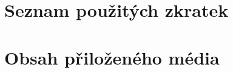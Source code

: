 \documentclass[thesis=B,czech,hidelinks]{dependencies/Thesis}
\begin{document}

\renewcommand{\thefigure}{\arabic{chapter}.\arabic{figure}}
\renewcommand{\figurename}{Obrázek}

\renewcommand{\thetable}{\arabic{chapter}.\arabic{table}}
\renewcommand{\tablename}{Tabulka}

\renewcommand{\thelisting}{\arabic{chapter}.\arabic{listing}}



\begin{introduction}
   \listoftodos
   
\end{introduction}










\begin{conclusion}
   
\end{conclusion}

\begin{literature}
   \printbibliography[heading=none]
\end{literature}



\appendix

\chapter{Seznam použitých zkratek}
\printglossary[type=\acronymtype,style=acronyms]

\chapter{Obsah přiloženého média}


\end{document}
